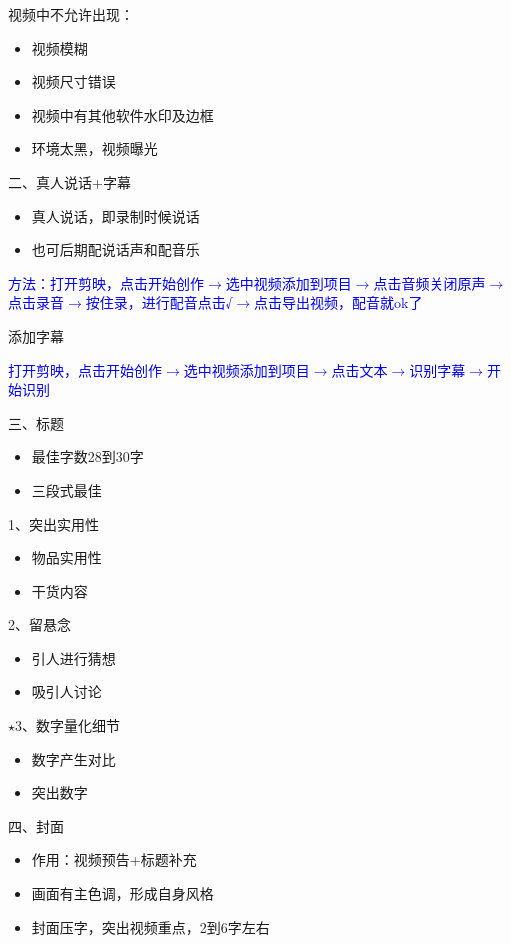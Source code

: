 \documentclass{book}
\begin{document}
视频中不允许出现：\begin{itemize}
           \item 视频模糊
           \item 视频尺寸错误
           \item 视频中有其他软件水印及边框
           \item 环境太黑，视频曝光
         \end{itemize}

二、真人说话+字幕\begin{itemize}
           \item 真人说话，即录制时候说话
           \item 也可后期配说话声和配音乐
         \end{itemize}

\textcolor{blue}{方法：打开剪映，点击开始创作$\rightarrow$选中视频添加到项目$\rightarrow$点击音频关闭原声$\rightarrow$点击录音$\rightarrow$按住录，进行配音点击√$\rightarrow$点击导出视频，配音就ok了}

添加字幕

\textcolor{blue}{打开剪映，点击开始创作$\rightarrow$选中视频添加到项目$\rightarrow$点击文本$\rightarrow$识别字幕$\rightarrow$开始识别}

三、标题\begin{itemize}
      \item 最佳字数28到30字
      \item 三段式最佳
    \end{itemize}
    1、突出实用性\begin{itemize}
             \item 物品实用性
             \item 干货内容
           \end{itemize}
    2、留悬念\begin{itemize}
           \item 引人进行猜想
           \item 吸引人讨论
         \end{itemize}
    $\star$3、数字量化细节\begin{itemize}
              \item 数字产生对比
              \item 突出数字
            \end{itemize}

四、封面\begin{itemize}
      \item 作用：视频预告+标题补充
      \item 画面有主色调，形成自身风格
      \item 封面压字，突出视频重点，2到6字左右
    \end{itemize}
\end{document}
